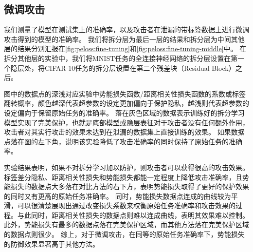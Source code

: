 \subsection{微调攻击}

我们测量了模型在测试集上的准确率，以及攻击者在泄漏的带标签数据上进行微调攻击得到的模型的准确率。
我们将拆分层为最后一层的结果和拆分层为中间其他层的结果分别汇报在\autoref{fig:peloss:fine-tuning}和\autoref{fig:peloss:fine-tuning-middle}中。
%
在拆分其他层的实验中，我们将MNIST任务的全连接神经网络的拆分层设置在第一个隐层处，将CIFAR-10任务的拆分层设置在第二个残差块（Residual Block）之后。

图中的数据点的深浅对应实验中势能损失函数/距离相关性损失函数的系数或标签翻转概率，颜色越深代表超参数的设定更加偏向于保护隐私，越浅则代表超参数的设定偏向于保留原始任务的准确率。
%
落在灰色区域的数据表示训练好的拆分学习模型实现了完美保护，也就是底部模型或隐层表征对于攻击者没有任何额外作用，攻击者对其实行攻击的效果未达到在泄漏的数据集上直接训练的效果。
%
如果数据点落在图的左下角，说明该实验降低了攻击准确率的同时保持了原始任务的准确率。

实验结果表明，如果不对拆分学习加以防护，则攻击者可以获得很高的攻击效果。
%
标签差分隐私、距离相关性损失和势能损失都能一定程度上降低攻击准确率，且势能损失的数据点大多落在对比方法的右下方，表明势能损失取得了更好的保护效果的同时又有更高的原始任务准确率。
%
同时，势能损失数据点连成的曲线较为平滑，可以很清楚展现出通过改变损失系数来权衡原始任务准确率和攻击效果的过程。与此同时，距离相关性损失的数据点则难以连成曲线，表明其效果难以控制。
%
此外，势能损失有最多的数据点落在完美保护区域，而其他方法落在完美保护区域的数据点则很少。
%
综上，对于微调攻击，在同等的原始任务准确率下，势能损失的防御效果显著高于其他方法。

